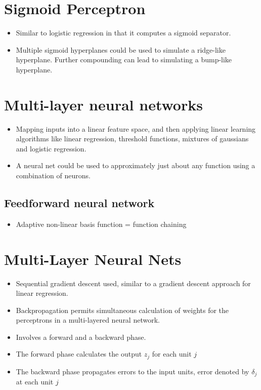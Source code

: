 \documentclass[parskip=half]{scrartcl}
\begin{document}
    \section{Sigmoid Perceptron}\label{sigmoid-perceptron}

    \begin{itemize}
        \item
        Similar to logistic regression in that it computes a sigmoid
        separator.
        \item
        Multiple sigmoid hyperplanes could be used to simulate a ridge-like
        hyperplane. Further compounding can lead to simulating a bump-like
        hyperplane.
    \end{itemize}

    \section{Multi-layer neural networks}\label{multi-layer-neural-networks}

    \begin{itemize}
        \item
        Mapping inputs into a linear feature space, and then applying linear
        learning algorithms like linear regression, threshold functions,
        mixtures of gaussians and logistic regression.
        \item
        A neural net could be used to approximately just about any function
        using a combination of neurons.
    \end{itemize}

    \subsection{Feedforward neural
    network}\label{feedforward-neural-network}

    \begin{itemize}
        \item
        Adaptive non-linear basis function = function chaining
    \end{itemize}

    \section{Multi-Layer Neural Nets}\label{multi-layer-neural-nets}

    \begin{itemize}
        \item
        Sequential gradient descent used, similar to a gradient descent
        approach for linear regression.
        \item
        Backpropagation permits simultaneous calculation of weights for the
        perceptrons in a multi-layered neural network.
        \item
        Involves a forward and a backward phase.
        \item 
        The forward phase calculates the output $z_j$ for each unit $j$
        \item
        The backward phase propagates errors to the input units, error denoted
        by $\delta_j$ at each unit $j$
    \end{itemize}
\end{document}
